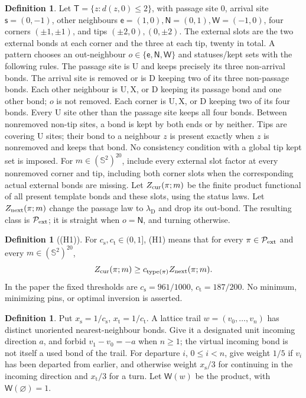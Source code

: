 \documentclass[11pt,reqno]{amsart}
\theoremstyle{definition}
\newtheorem{definition}[theorem]{Definition}
\theoremstyle{remark}
\begin{document}
\begin{definition}\label{d:pattern}
Let \(\mathsf T=\{z:d(z,0)\le2\}\), with passage site \(0\),
arrival site \(\mathsf s=(0,-1)\), other neighbours
\(\mathsf e=(1,0),\mathsf N=(0,1),\mathsf W=(-1,0)\),
four corners \((\pm1,\pm1)\), and tips \((\pm2,0),(0,\pm2)\).
The external slots are the two external bonds at each corner and
the three at each tip, twenty in total.
A pattern chooses an out-neighbour \(o\in\{\mathsf e,\mathsf N,\mathsf W\}\)
and statuses/kept sets with the following rules.
The passage site is \(\mathrm U\) and keeps precisely its three
non-arrival bonds. The arrival site is removed or is \(\mathrm D\)
keeping two of its three non-passage bonds.
Each other neighbour is \(\mathrm U,\mathrm X\), or \(\mathrm D\)
keeping its passage bond and one other bond; \(o\) is not removed.
Each corner is \(\mathrm U,\mathrm X\), or \(\mathrm D\) keeping
two of its four bonds. Every \(\mathrm U\) site other than the
passage site keeps all four bonds.
Between nonremoved non-tip sites, a bond is kept by both ends or
by neither. Tips are covering \(\mathrm U\) sites; their bond to
a neighbour \(z\) is present exactly when \(z\) is nonremoved and
keeps that bond. No consistency condition with a global tip kept
set is imposed.
For \(m\in(\mathbb S^2)^{20}\), include every external slot factor
at every nonremoved corner and tip, including both corner slots
when the corresponding actual external bonds are missing.
Let \(Z_{\rm cur}(\pi;m)\) be the finite product functional of
all present template bonds and these slots, using the status laws.
Let \(Z_{\rm next}(\pi;m)\) change the passage law to
\(\lambda_{\mathrm D}\) and drop its out-bond.
The resulting class is \(\mathcal P_{\rm ext}\); it is straight
when \(o=\mathsf N\), and turning otherwise.
\end{definition}

\begin{definition}[(H1)]\label{h:H1}
For \(c_{\mathrm s},c_{\mathrm t}\in(0,1]\), (H1) means that
for every \(\pi\in\mathcal P_{\rm ext}\) and every
\(m\in(\mathbb S^2)^{20}\),
\[
 Z_{\rm cur}(\pi;m)\ge c_{\rm type(\pi)}Z_{\rm next}(\pi;m).
\]
In the paper the fixed thresholds are
\(c_{\mathrm s}=961/1000\), \(c_{\mathrm t}=187/200\).
No minimum, minimizing pins, or optimal inversion is asserted.
\end{definition}

\begin{definition}\label{d:weights}
Put \(x_{\mathrm s}=1/c_{\mathrm s}\), \(x_{\mathrm t}=1/c_{\mathrm t}\).
A lattice trail \(w=(v_0,\ldots,v_n)\) has distinct unoriented
nearest-neighbour bonds. Give it a designated unit incoming direction
\(a\), and forbid \(v_1-v_0=-a\) when \(n\ge1\); the virtual
incoming bond is not itself a used bond of the trail.
For departure \(i\), \(0\le i<n\), give weight \(1/5\) if \(v_i\)
has been departed from earlier, and otherwise weight \(x_{\mathrm s}/3\)
for continuing in the incoming direction and \(x_{\mathrm t}/3\)
for a turn. Let \(\mathsf W(w)\) be the product, with
\(\mathsf W(\varnothing)=1\).
\end{definition}
\end{document}
